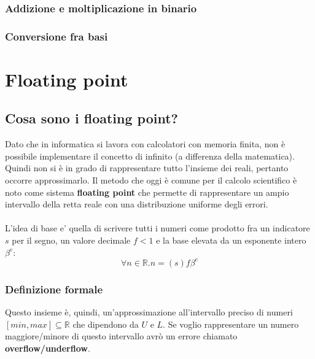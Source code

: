 \subsection{Addizione e moltiplicazione in binario}
\subsection{Conversione fra basi}

\chapter{Floating point}

\section{Cosa sono i floating point?}
Dato che in informatica si lavora con calcolatori con memoria finita, non è possibile implementare il concetto di infinito (a differenza della matematica). Quindi non si è in grado di rappresentare tutto l'insieme dei reali, pertanto occorre approssimarlo. Il metodo che oggi è comune per il calcolo scientifico è noto come sistema \textbf{floating point} che permette di rappresentare un ampio intervallo della retta reale con una distribuzione uniforme degli errori.\\
\\
L'idea di base e' quella di scrivere tutti i numeri come prodotto fra un indicatore $ s $ per il segno, un valore decimale $ f < 1 $ e la base elevata da un esponente intero $ \beta^e $:
\[
  \forall n \in \mathbb{R}. n = (s) f \beta^e
\]

\subsection{Definizione formale}

Questo insieme è, quindi, un'approssimazione all'intervallo preciso di numeri $[min, max] \subseteq \mathbb{R}$ che dipendono da $U$ e $L$. Se voglio rappresentare un numero maggiore/minore di questo intervallo avrò un errore chiamato \textbf{overflow/underflow}.


